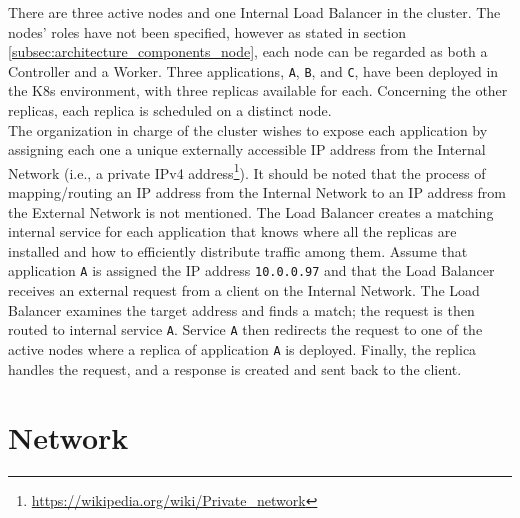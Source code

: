 There are three active nodes and one Internal Load Balancer in the cluster. The
nodes' roles have not been specified, however as stated in section
\ref{subsec:architecture_components_node}, each node can be regarded as both a Controller
and a Worker. Three applications, \texttt{A}, \texttt{B}, and \texttt{C}, have been
deployed in the K8s environment, with three replicas available for each. Concerning
the other replicas, each replica is scheduled on a distinct node. \\ %
The organization in charge of the cluster wishes to expose each application by
assigning each one a unique externally accessible IP address from the Internal
Network (i.e., a private IPv4 address\footnote{\url{https://wikipedia.org/wiki/Private_network}}).
It should be noted that the process of mapping/routing an IP address from the Internal
Network to an IP address from the External Network is not mentioned. The Load
Balancer creates a matching internal service for each application that knows
where all the replicas are installed and how to efficiently distribute traffic
among them. Assume that application \texttt{A} is assigned the IP address
\texttt{10.0.0.97} and that the Load Balancer receives an external request from a
client on the Internal Network. The Load Balancer examines the target address
and finds a match; the request is then routed to internal service \texttt{A}. Service
\texttt{A} then redirects the request to one of the active nodes where a replica
of application \texttt{A} is deployed. Finally, the replica handles the request,
and a response is created and sent back to the client.

\section{Network}
\label{sec:architecture_network}

